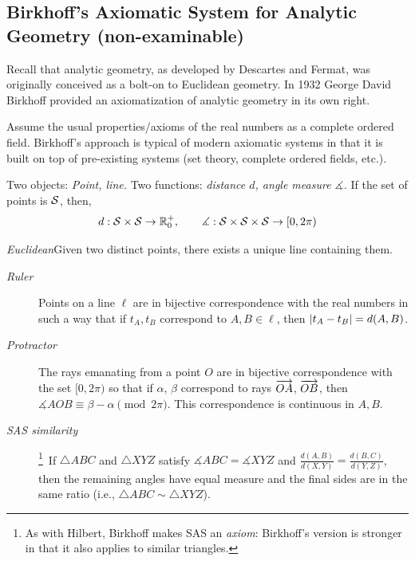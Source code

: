 \clearpage


\subsection{Birkhoff's Axiomatic System for Analytic Geometry (non-examinable)}

Recall that analytic geometry, as developed by Descartes and Fermat, was originally conceived as a bolt-on to Euclidean geometry. In 1932 George David Birkhoff %
provided an axiomatization of analytic geometry in its own right. %



Assume the usual properties/axioms of the real numbers as a complete ordered field. Birkhoff's approach is typical of modern axiomatic systems in that it is built on top of pre-existing systems (set theory, complete ordered fields, etc.).


Two objects: \emph{Point, line.} Two functions: \emph{distance $d$, angle measure $\measuredangle$.} If the set of points is $\mathcal{S}$, then,
\[
	d:\mathcal{S}\times\mathcal{S}\to\mathbb{R}^+_0,\qquad \measuredangle:\mathcal{S}\times\mathcal{S}\times\mathcal{S}\to [0,2\pi)
\]



\emph{Euclidean}\lstsp Given two distinct points, there exists a unique line containing them.
\begin{description}%
  \item[\normalfont\emph{Ruler}] Points on a line $\ell$ are in bijective correspondence with the real numbers in such a way that if $t_A,t_B$ correspond to $A,B\in\ell$, then $\left| t_A-t_B\right|=d(A,B)$.
  \item[\normalfont\emph{Protractor}] The rays emanating from a point $O$ are in bijective correspondence with the set $[0,2\pi)$ so that if $\alpha$, $\beta$ correspond to rays $\overrightarrow{OA}$, $\overrightarrow{OB}$, then $\measuredangle AOB\equiv \beta-\alpha\pmod{2\pi}$. This correspondence is continuous in $A,B$.
  \item[\normalfont\emph{SAS similarity}]\!\!\footnote{%
		As with Hilbert, Birkhoff makes SAS an \emph{axiom}: Birkhoff's version is stronger in that it also applies to similar triangles.%
	}\, If $\triangle ABC$ and $\triangle XYZ$ satisfy $\measuredangle ABC=\measuredangle XYZ$ and $\frac{d(A,B)}{d(X,Y)}=\frac{d(B,C)}{d(Y,Z)}$, then the remaining angles have equal measure and the final sides are in the same ratio (i.e., $\triangle ABC\sim\triangle XYZ$).
\end{description}


